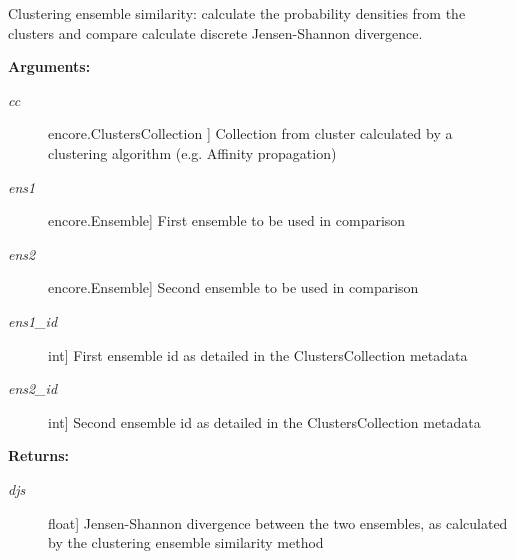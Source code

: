 \documentclass[letterpaper,10pt,english]{sphinxmanual}
\begin{document}
\begin{fulllineitems}
\label{index:encore.similarity.clustering_ensemble_similarity}
Clustering ensemble similarity: calculate the probability densities from the clusters and compare calculate discrete Jensen-Shannon divergence.

\textbf{Arguments:}
\begin{description}
\item[{\emph{cc}}] \leavevmode{[}encore.ClustersCollection {]}
Collection from cluster calculated by a clustering algorithm (e.g. Affinity propagation)

\item[{\emph{ens1}}] \leavevmode{[}encore.Ensemble{]}
First ensemble to be used in comparison

\item[{\emph{ens2}}] \leavevmode{[}encore.Ensemble{]}
Second ensemble to be used in comparison

\item[{\emph{ens1\_id}}] \leavevmode{[}int{]}
First ensemble id as detailed in the ClustersCollection metadata

\item[{\emph{ens2\_id}}] \leavevmode{[}int{]}
Second ensemble id as detailed in the ClustersCollection metadata

\end{description}

\textbf{Returns:}
\begin{description}
\item[{\emph{djs}}] \leavevmode{[}float{]}
Jensen-Shannon divergence between the two ensembles, as calculated by the clustering ensemble similarity method

\end{description}

\end{fulllineitems}

\end{document}
